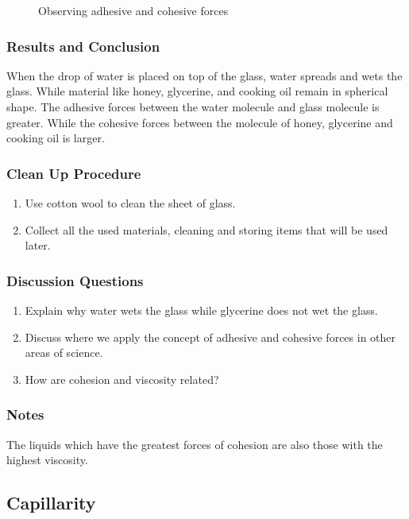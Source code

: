 \begin{figure}
\begin{center}
\def\svgwidth{2cm}

\caption{Observing adhesive and cohesive forces}
\label{fig:adhesion-cohesion}
\end{center}
\end{figure}

\subsubsection*{Results and Conclusion}
When the drop of water is placed on top of the glass, water spreads and wets the glass. While material like honey, glycerine, and cooking oil remain in spherical shape. The adhesive forces between the water molecule and glass molecule is greater. While the cohesive forces between the molecule of honey, glycerine and cooking oil is larger.

\subsubsection*{Clean Up Procedure}
\begin{enumerate}
\item{Use cotton wool to clean the sheet of glass.}
\item{Collect all the used materials, cleaning and storing items that will be used later.}
\end{enumerate}

\subsubsection*{Discussion Questions}
\begin{enumerate}
\item{Explain why water wets the glass while glycerine does not wet the glass.}
\item{Discuss where we apply the concept of adhesive and cohesive forces in other areas of science.}
\item{How are cohesion and viscosity related?}
\end{enumerate}

\subsubsection*{Notes}
The liquids which have the greatest forces of cohesion are also those with the highest viscosity.

\subsection{Capillarity}

